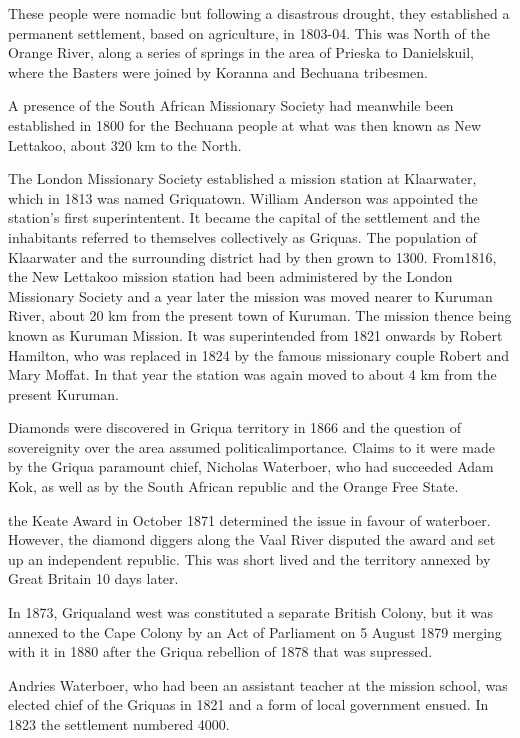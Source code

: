 These people were nomadic but following a disastrous drought, they established a permanent settlement, based on agriculture, in 1803-04. This was North of the Orange River, along a series of springs in the area of Prieska to Danielskuil, where the Basters were joined by Koranna and Bechuana tribesmen.

A presence of the South African Missionary Society had meanwhile been established in 1800 for the Bechuana people at what was then known as New Lettakoo, about 320 km to the North.

The London Missionary Society established a mission station at Klaarwater, which in 1813 was named Griquatown. William Anderson was appointed the station's first superintentent. It became the capital of the settlement and the inhabitants referred to themselves collectively as Griquas. The population of Klaarwater and the surrounding district had by then grown to 1300. From1816, the New Lettakoo mission station had been administered by the London Missionary Society and a year later the mission was moved nearer to Kuruman River, about 20 km from the present town of Kuruman. The mission thence being known as Kuruman Mission. It was superintended from 1821 onwards by Robert Hamilton, who was replaced in 1824 by the famous missionary couple Robert and Mary Moffat. In that year the station was again moved to about 4 km from the present Kuruman.

Diamonds were discovered in Griqua territory in 1866 and the question of sovereignity over the area assumed politicalimportance. Claims to it were made by the Griqua paramount chief, Nicholas Waterboer, who had succeeded Adam Kok, as well as by the South African republic and the Orange Free State.

the Keate Award in October 1871 determined the issue in favour of waterboer. However, the diamond diggers along the Vaal River disputed the award and set up an independent republic. This was short lived and the territory annexed by Great Britain 10 days later.

In 1873, Griqualand west was constituted a separate British Colony, but it was annexed to the Cape Colony by an Act of Parliament on 5 August 1879 merging with it in 1880 after the Griqua rebellion of 1878 that was supressed.

Andries Waterboer, who had been an assistant teacher at the mission school, was elected chief of the Griquas in 1821 and a form of local government ensued. In 1823 the settlement numbered 4000.


